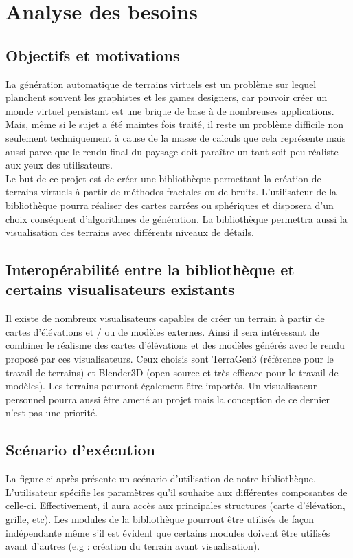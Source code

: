 \chapter{Analyse des besoins}

\section{Objectifs et motivations}
La génération automatique de terrains virtuels est un problème sur lequel
planchent souvent les graphistes et les games designers, car pouvoir créer
 un monde virtuel persistant est une brique de base à de nombreuses
applications. Mais, même si le sujet a été maintes fois traité, il reste un
problème difficile non seulement techniquement à cause de la masse de calculs
 que cela représente mais aussi parce que le rendu final du paysage doit
paraître un tant soit peu réaliste aux yeux des utilisateurs.\\

Le but de ce projet est de créer une bibliothèque permettant la création de
terrains virtuels à partir de méthodes fractales ou de bruits. L'utilisateur de la bibliothèque
pourra réaliser des cartes carrées ou sphériques et disposera d'un choix
conséquent d'algorithmes de génération.
La bibliothèque permettra aussi la visualisation des terrains avec différents
niveaux de détails. \\

\section{Interopérabilité entre la bibliothèque et certains visualisateurs existants}
Il existe de nombreux visualisateurs capables de créer un terrain à partir de cartes d'élévations et / ou de modèles externes.
Ainsi il sera intéressant de combiner le réalisme des cartes d'élévations et des modèles générés avec le rendu proposé par ces visualisateurs. Ceux choisis sont TerraGen3 (référence pour le travail de terrains) et Blender3D (open-source et très efficace pour le travail de modèles). 
Les terrains pourront également être importés. Un visualisateur personnel pourra aussi être amené au projet mais la conception de ce dernier n'est pas une priorité.

\section{Scénario d'exécution}
La figure ci-après présente un scénario d'utilisation de notre
bibliothèque.
L'utilisateur spécifie les paramètres qu'il souhaite aux différentes composantes de
celle-ci. Effectivement, il aura accès aux principales structures (carte d'élévation,
grille, etc).
Les modules de la bibliothèque pourront être utilisés de façon indépendante même s'il
est évident que certains modules doivent être utilisés avant d'autres (e.g : création du terrain avant visualisation).


